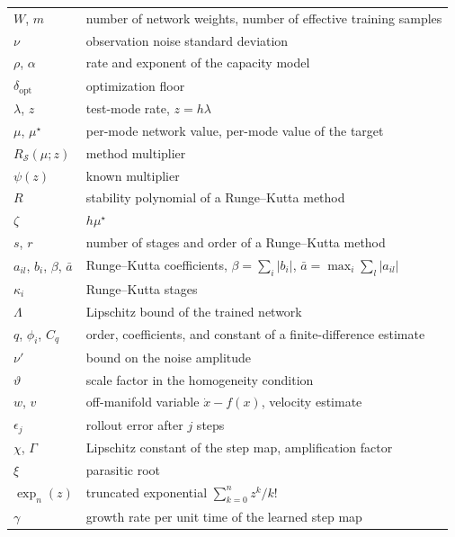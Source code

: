 \documentclass[11pt]{article}
\theoremstyle{definition}
\theoremstyle{remark}
\newcommand{\Meth}{\mathcal{S}}          %
\newcommand{\expt}[1]{\exp_{#1}}         %
\begin{document}
\begin{table}[htbp]
\begin{tabular}{@{}p{}p{}@{}}
$W$, $m$ & number of network weights, number of effective training samples \\
$\nu$ & observation noise standard deviation \\
$\rho$, $\alpha$ & rate and exponent of the capacity model \\
$\delta_{\mathrm{opt}}$ & optimization floor \\
$\lambda$, $z$ & test-mode rate, $z = h\lambda$ \\
$\mu$, $\mu^\star$ & per-mode network value, per-mode value of the target \\
$R_\Meth(\mu;z)$ & method multiplier \\
$\psi(z)$ & known multiplier \\
$R$ & stability polynomial of a Runge--Kutta method \\
$\zeta$ & $h\mu^\star$ \\
$s$, $r$ & number of stages and order of a Runge--Kutta method \\
$a_{il}$, $b_i$, $\beta$, $\bar a$ & Runge--Kutta coefficients, $\beta = \sum_i|b_i|$, $\bar a = \max_i\sum_l|a_{il}|$ \\
$\kappa_i$ & Runge--Kutta stages \\
$\Lambda$ & Lipschitz bound of the trained network \\
$q$, $\phi_i$, $C_q$ & order, coefficients, and constant of a finite-difference estimate \\
$\nu'$ & bound on the noise amplitude \\
$\vartheta$ & scale factor in the homogeneity condition \\
$w$, $v$ & off-manifold variable $\dot x - f(x)$, velocity estimate \\
$\epsilon_j$ & rollout error after $j$ steps \\
$\chi$, $\Gamma$ & Lipschitz constant of the step map, amplification factor \\
$\xi$ & parasitic root \\
$\expt{n}(z)$ & truncated exponential $\sum_{k=0}^{n} z^k/k!$ \\
$\gamma$ & growth rate per unit time of the learned step map \\
\bottomrule
\end{tabular}
\end{table}
\end{document}
